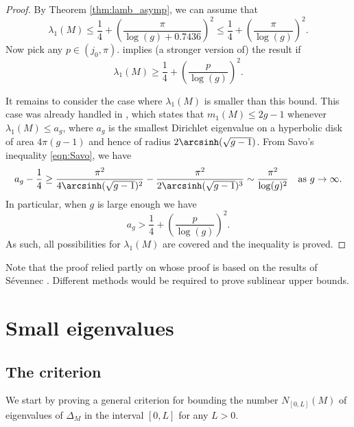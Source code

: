 \documentclass[12pt]{amsart}
\numberwithin{equation}{section}
\begin{document}
\begin{proof} By Theorem \ref{thm:lamb_asymp}, we can assume that 
\[
\lambda_1(M) \leq \frac14 + \left(\frac{\pi}{\log(g)+0.7436}\right)^2 \leq \frac14 + \left(\frac{\pi}{\log(g)}\right)^2.
\]
Now pick any $p\in (j_0,\pi)$.  implies (a stronger version of) the result if 
\[
\lambda_1(M) \geq \frac14 + \left(\frac{p}{\log(g)}\right)^2.
\]

It remains to consider the case where $\lambda_1(M)$ is smaller than this bound. This case was already handled in \cite[Theorem 1.1]{Klein}, which states that $m_1(M) \leq 2g-1$ whenever $\lambda_1(M) \leq a_g$, where $a_g$ is the smallest Dirichlet eigenvalue on a hyperbolic disk of area $4\pi(g-1)$  and hence of radius $2\arcsinh(\sqrt{g-1})$. From Savo's inequality \eqref{eqn:Savo}, we have
\[
a_g - \frac{1}{4}  \geq \frac{\pi^2}{4\arcsinh(\sqrt{g-1})^2} - \frac{\pi^2}{2\arcsinh(\sqrt{g-1})^3} \sim \frac{\pi^2}{\log(g)^2} \quad \text{as } g\to \infty.
\]
In particular, when $g$ is large enough we have
\[
a_g > \frac{1}{4}+ \left(\frac{p}{\log(g)}\right)^2.
\]
As such, all possibilities for $\lambda_1(M)$ are covered and the inequality is proved.
\end{proof}

Note that the proof relied partly on \cite[Theorem 1.1]{Klein} whose proof is based on the results of Sévennec \cite{Sevennec}. Different methods would be required to prove sublinear upper bounds. 

\section{Small eigenvalues}

\subsection{The criterion}

We start by proving a general criterion for bounding the number $N_{[0,L]}(M)$ of eigenvalues of $\Delta_M$ in the interval $[0,L]$ for any $L>0$. 
\end{document}
